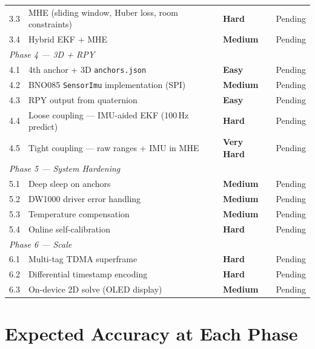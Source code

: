 \documentclass[11pt,a4paper]{article}
\newcommand{\easy}{\textcolor{dkgreen}{\textbf{Easy}}}
\newcommand{\medium}{\textcolor{dkorange}{\textbf{Medium}}}
\newcommand{\hard}{\textcolor{dkred}{\textbf{Hard}}}
\newcommand{\vhard}{\textcolor{dkred}{\textbf{Very Hard}}}
\begin{document}
\begin{longtable}{llll}
3.3 & MHE (sliding window, Huber loss, room constraints) & \hard & Pending \\
3.4 & Hybrid EKF + MHE & \medium & Pending \\
\midrule
\multicolumn{4}{l}{\textit{Phase 4 --- 3D + RPY}} \\
\midrule
4.1 & 4th anchor + 3D \texttt{anchors.json} & \easy & Pending \\
4.2 & BNO085 \texttt{SensorImu} implementation (SPI) & \medium & Pending \\
4.3 & RPY output from quaternion & \easy & Pending \\
4.4 & Loose coupling --- IMU-aided EKF (100\,Hz predict) & \hard & Pending \\
4.5 & Tight coupling --- raw ranges + IMU in MHE & \vhard & Pending \\
\midrule
\multicolumn{4}{l}{\textit{Phase 5 --- System Hardening}} \\
\midrule
5.1 & Deep sleep on anchors & \medium & Pending \\
5.2 & DW1000 driver error handling & \medium & Pending \\
5.3 & Temperature compensation & \medium & Pending \\
5.4 & Online self-calibration & \hard & Pending \\
\midrule
\multicolumn{4}{l}{\textit{Phase 6 --- Scale}} \\
\midrule
6.1 & Multi-tag TDMA superframe & \hard & Pending \\
6.2 & Differential timestamp encoding & \hard & Pending \\
6.3 & On-device 2D solve (OLED display) & \medium & Pending \\
\bottomrule
\end{longtable}

\section{Expected Accuracy at Each Phase}
\end{document}
